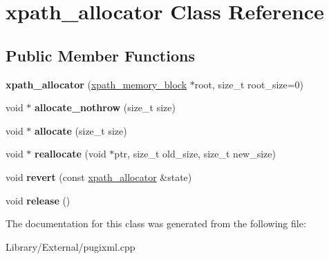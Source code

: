 \hypertarget{classxpath__allocator}{}\section{xpath\+\_\+allocator Class Reference}
\label{classxpath__allocator}
\subsection*{Public Member Functions}
\begin{DoxyCompactItemize}
\item 
\hypertarget{classxpath__allocator_a3b8ba1722fba115d05949d8f592080e8}{}{\bfseries xpath\+\_\+allocator} (\hyperlink{structxpath__memory__block}{xpath\+\_\+memory\+\_\+block} $\ast$root, size\+\_\+t root\+\_\+size=0)\label{classxpath__allocator_a3b8ba1722fba115d05949d8f592080e8}

\item 
\hypertarget{classxpath__allocator_aa66f3703548657eca5316392a2d79d00}{}void $\ast$ {\bfseries allocate\+\_\+nothrow} (size\+\_\+t size)\label{classxpath__allocator_aa66f3703548657eca5316392a2d79d00}

\item 
\hypertarget{classxpath__allocator_aad95aa445f2fdc7c3d1c19b1f3d67cb1}{}void $\ast$ {\bfseries allocate} (size\+\_\+t size)\label{classxpath__allocator_aad95aa445f2fdc7c3d1c19b1f3d67cb1}

\item 
\hypertarget{classxpath__allocator_a4dd502389202ec8e7420832112a571e5}{}void $\ast$ {\bfseries reallocate} (void $\ast$ptr, size\+\_\+t old\+\_\+size, size\+\_\+t new\+\_\+size)\label{classxpath__allocator_a4dd502389202ec8e7420832112a571e5}

\item 
\hypertarget{classxpath__allocator_af1c3ec117935d4488bbd16adf807fbc1}{}void {\bfseries revert} (const \hyperlink{classxpath__allocator}{xpath\+\_\+allocator} \&state)\label{classxpath__allocator_af1c3ec117935d4488bbd16adf807fbc1}

\item 
\hypertarget{classxpath__allocator_a9436b8bdef3e0e0ff0df28c2af6a430d}{}void {\bfseries release} ()\label{classxpath__allocator_a9436b8bdef3e0e0ff0df28c2af6a430d}

\end{DoxyCompactItemize}


The documentation for this class was generated from the following file\+:\begin{DoxyCompactItemize}
\item 
Library/\+External/pugixml.\+cpp\end{DoxyCompactItemize}
